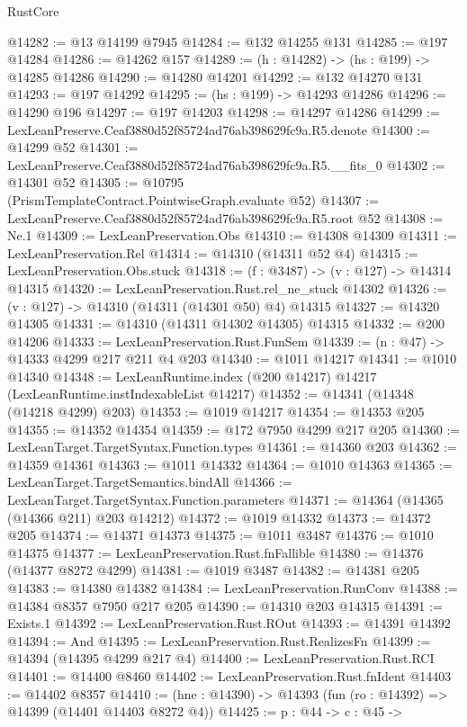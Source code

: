 \begin{lexlean}{RustCore}
\begin{coremodule}
@14282 := @13 @14199 @7945
@14284 := @132 @14255 @131
@14285 := @197 @14284
@14286 := @14262 @157
@14289 := (h : @14282) -> (hs : @199) -> @14285 @14286
@14290 := @14280 @14201
@14292 := @132 @14270 @131
@14293 := @197 @14292
@14295 := (hs : @199) -> @14293 @14286
@14296 := @14290 @196
@14297 := @197 @14203
@14298 := @14297 @14286
@14299 := LexLeanPreserve.Ceaf3880d52f85724ad76ab398629fc9a.R5.denote
@14300 := @14299 @52
@14301 := LexLeanPreserve.Ceaf3880d52f85724ad76ab398629fc9a.R5.__fits_0
@14302 := @14301 @52
@14305 := @10795 (PrismTemplateContract.PointwiseGraph.evaluate @52)
@14307 := LexLeanPreserve.Ceaf3880d52f85724ad76ab398629fc9a.R5.root @52
@14308 := Ne.{1}
@14309 := LexLeanPreservation.Obs
@14310 := @14308 @14309
@14311 := LexLeanPreservation.Rel
@14314 := @14310 (@14311 @52 @4)
@14315 := LexLeanPreservation.Obs.stuck
@14318 := (f : @3487) -> (v : @127) -> @14314 @14315
@14320 := LexLeanPreservation.Rust.rel_ne_stuck @14302
@14326 := (v : @127) -> @14310 (@14311 (@14301 @50) @4) @14315
@14327 := @14320 @14305
@14331 := @14310 (@14311 @14302 @14305) @14315
@14332 := @200 @14206
@14333 := LexLeanPreservation.Rust.FunSem
@14339 := (n : @47) -> @14333 @4299 @217 @211 @4 @203
@14340 := @1011 @14217
@14341 := @1010 @14340
@14348 := LexLeanRuntime.index (@200 @14217) @14217 (LexLeanRuntime.instIndexableList @14217)
@14352 := @14341 (@14348 (@14218 @4299) @203)
@14353 := @1019 @14217
@14354 := @14353 @205
@14355 := @14352 @14354
@14359 := @172 @7950 @4299 @217 @205
@14360 := LexLeanTarget.TargetSyntax.Function.types
@14361 := @14360 @203
@14362 := @14359 @14361
@14363 := @1011 @14332
@14364 := @1010 @14363
@14365 := LexLeanTarget.TargetSemantics.bindAll
@14366 := LexLeanTarget.TargetSyntax.Function.parameters
@14371 := @14364 (@14365 (@14366 @211) @203 @14212)
@14372 := @1019 @14332
@14373 := @14372 @205
@14374 := @14371 @14373
@14375 := @1011 @3487
@14376 := @1010 @14375
@14377 := LexLeanPreservation.Rust.fnFallible
@14380 := @14376 (@14377 @8272 @4299)
@14381 := @1019 @3487
@14382 := @14381 @205
@14383 := @14380 @14382
@14384 := LexLeanPreservation.RunConv
@14388 := @14384 @8357 @7950 @217 @205
@14390 := @14310 @203 @14315
@14391 := Exists.{1}
@14392 := LexLeanPreservation.Rust.ROut
@14393 := @14391 @14392
@14394 := And
@14395 := LexLeanPreservation.Rust.RealizesFn
@14399 := @14394 (@14395 @4299 @217 @4)
@14400 := LexLeanPreservation.Rust.RCI
@14401 := @14400 @8460
@14402 := LexLeanPreservation.Rust.fnIdent
@14403 := @14402 @8357
@14410 := (hne : @14390) -> @14393 (fun (ro : @14392) => @14399 (@14401 @14403 @8272 @4))
@14425 := {p : @44} ->
  {c : @45} ->

\end{coremodule}
\end{lexlean}
